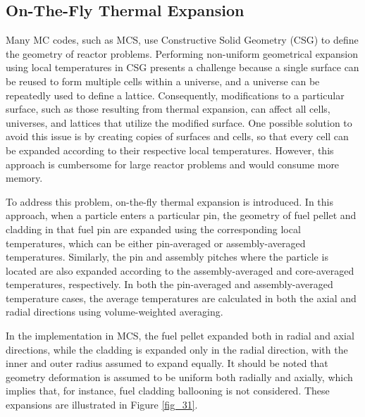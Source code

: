 \subsection{On-The-Fly Thermal Expansion} \label{sec33}

Many MC codes, such as MCS, use Constructive Solid Geometry (CSG) to define the geometry of reactor problems. Performing non-uniform geometrical expansion using local temperatures in CSG presents a challenge because a single surface can be reused to form multiple cells within a universe, and a universe can be repeatedly used to define a lattice. Consequently, modifications to a particular surface, such as those resulting from thermal expansion, can affect all cells, universes, and lattices that utilize the modified surface. One possible solution to avoid this issue is by creating copies of surfaces and cells, so that every cell can be expanded according to their respective local temperatures. However, this approach is cumbersome for large reactor problems and would consume more memory.

To address this problem, on-the-fly thermal expansion is introduced. In this approach, when a particle enters a particular pin, the geometry of fuel pellet and cladding in that fuel pin are expanded using the corresponding local temperatures, which can be either pin-averaged or assembly-averaged temperatures. Similarly, the pin and assembly pitches where the particle is located are also expanded according to the assembly-averaged and core-averaged temperatures, respectively. In both the pin-averaged and assembly-averaged temperature cases, the average temperatures are calculated in both the axial and radial directions using volume-weighted averaging.

In the implementation in MCS, the fuel pellet expanded both in radial and axial directions, while the cladding is expanded only in the radial direction, with the inner and outer radius assumed to expand equally. It should be noted that geometry deformation is assumed to be uniform both radially and axially, which implies that, for instance, fuel cladding ballooning is not considered. These expansions are illustrated in Figure \ref{fig_31}.

